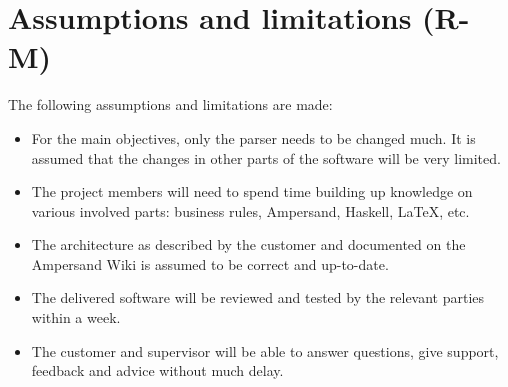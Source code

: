 \section{Assumptions and limitations (R-M)}
\label{sec:assumptions-limitations}
The following assumptions and limitations are made:
\begin{itemize}
	\item For the main objectives, only the parser needs to be changed much.
		It is assumed that the changes in other parts of the software will be very limited.
	\item The project members will need to spend time building up knowledge on various involved parts:
		business rules, Ampersand, Haskell, LaTeX, etc.
	\item The architecture as described by the customer and documented on the Ampersand Wiki is assumed to be correct and up-to-date.
	\item The delivered software will be reviewed and tested by the relevant parties within a week.
	\item The customer and supervisor will be able to answer questions, give support, feedback and advice without much delay.
\end{itemize}